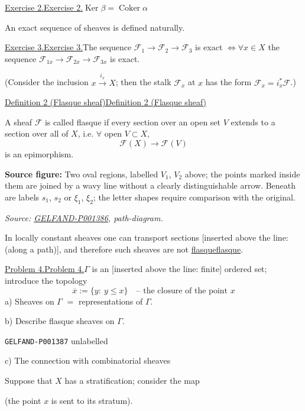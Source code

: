 \documentclass[11pt]{article}
\theoremstyle{definition}
\theoremstyle{remark}
\let\DiplomaticMathUnderline\underline
\renewcommand{\underline}[1]{\ifmmode\DiplomaticMathUnderline{#1}\else\uline{#1}\fi}
\providecommand{\EnglishSourceFrame}[2]{%
\par\addvspace{1em}\noindent\leavevmode\phantomsection\label{#1:source-page}%
{\footnotesize\sffamily\color{blue!55!black}\texttt{#1}%
\def\givenlabel{#2}\def\nolabel{unlabelled}%
\ifx\givenlabel\nolabel\else\quad[source label: #2]\fi}\par\nobreak\smallskip}
\providecommand{\EnglishSourceFigure}[3]{%
\par\noindent\begingroup\color{blue!55!black}\textbf{Source figure:} #3\par
{\footnotesize\textit{Source: \hyperref[#1:source-page]{#1}, #2.}}\endgroup\par}
\begin{document}
\underline{Exercise 2.}\quad $\operatorname{Ker}\beta=\operatorname{Coker}\alpha$

An exact sequence of sheaves is defined naturally.

\underline{Exercise 3.}\quad The sequence $\mathcal F_1\longrightarrow\mathcal F_2\longrightarrow\mathcal F_3$
is exact $\Longleftrightarrow\forall x\in X$
the sequence $\mathcal F_{1x}\longrightarrow\mathcal F_{2x}\longrightarrow\mathcal F_{3x}$ is exact.

(Consider the inclusion $x\overset{i_x}{\longrightarrow}X$; then the stalk $\mathcal F_x$ at $x$
has the form $\mathcal F_x=i_x^*\mathcal F$.)

\underline{Definition 2 (Flasque sheaf)}

A sheaf $\mathcal F$ is called flasque if every section over an open set $V$ extends
to a section over all of $X$, i.e. $\forall$ open $V\subset X$,
\begin{equation*}
\mathcal F(X)\longrightarrow\mathcal F(V)
\end{equation*}
is an epimorphism.

\EnglishSourceFigure{GELFAND-P001386}{path-diagram}{Two oval regions, labelled $V_1$, $V_2$ above; the points marked inside them are joined by a wavy line without a clearly distinguishable arrow. Beneath are labels $s_1$, $s_2$ or $\xi_1$, $\xi_2$; the letter shapes require comparison with the original.}



In locally constant sheaves one can transport sections [inserted above the line: (along a path)],
and therefore such sheaves are not \underline{flasque}.

\underline{Problem 4.}\quad $\Gamma$ is an [inserted above the line: finite] ordered set; introduce the topology
\begin{equation*}
\overline{x}:=\{y:\ y\leq x\}\quad\text{-- the closure of the point }x
\end{equation*}
a) Sheaves on $\Gamma$ $=$ representations of $\Gamma$.

b) Describe flasque sheaves on $\Gamma$.


\EnglishSourceFrame{GELFAND-P001387}{2}
c) The connection with combinatorial sheaves

Suppose that $X$ has a stratification; consider the map
(the point $x$ is sent to its stratum).
\end{document}
